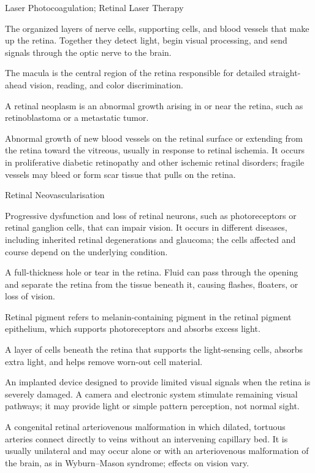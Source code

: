 \synonyms
Laser Photocoagulation; Retinal Laser Therapy

 The organized layers of nerve cells, supporting cells, and blood vessels that make up the retina. Together they detect light, begin visual processing, and send signals through the optic nerve to the brain.

 The macula is the central region of the retina responsible for detailed straight-ahead vision, reading, and color discrimination.

 A retinal neoplasm is an abnormal growth arising in or near the retina, such as retinoblastoma or a metastatic tumor.

 Abnormal growth of new blood vessels on the retinal surface or extending from the retina toward the vitreous, usually in response to retinal ischemia. It occurs in proliferative diabetic retinopathy and other ischemic retinal disorders; fragile vessels may bleed or form scar tissue that pulls on the retina.

\synonyms
Retinal Neovascularisation

 Progressive dysfunction and loss of retinal neurons,
such as photoreceptors or retinal ganglion cells, that can impair vision. It occurs in
different diseases, including inherited retinal degenerations and glaucoma; the cells
affected and course depend on the underlying condition.

 A full-thickness hole or tear in the retina. Fluid can pass through the opening and separate the retina from the tissue beneath it, causing flashes, floaters, or loss of vision.

 Retinal pigment refers to melanin-containing pigment in the retinal pigment epithelium, which supports photoreceptors and absorbs excess light.

 A layer of cells beneath the retina that supports the light-sensing cells, absorbs extra light, and helps remove worn-out cell material.

 An implanted device designed to provide limited visual signals when the retina is severely damaged. A camera and electronic system stimulate remaining visual pathways; it may provide light or simple pattern perception, not normal sight.

 A congenital retinal arteriovenous malformation in which dilated, tortuous arteries connect directly to veins without an intervening capillary bed. It is usually unilateral and may occur alone or with an arteriovenous malformation of the brain, as in Wyburn–Mason syndrome; effects on vision vary.

